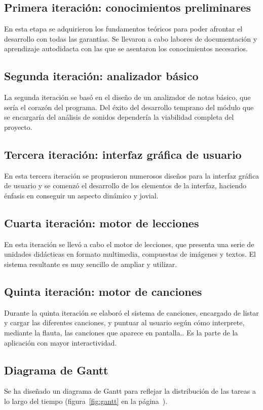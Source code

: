 \documentclass[a4paper,11pt]{article}
\begin{document}
\subsection{Primera iteración: conocimientos preliminares}
En esta etapa se adquirieron los fundamentos teóricos para poder afrontar el
desarrollo con todas las garantías. Se llevaron a cabo labores de documentación
y aprendizaje autodidacta con las que se asentaron los conocimientos necesarios.

\subsection{Segunda iteración: analizador básico}
La segunda iteración se basó en el diseño de un analizador de notas básico, que
sería el corazón del programa. Del éxito del desarrollo temprano del módulo que
se encargaría del análisis de sonidos dependería la viabilidad completa del
proyecto.

\subsection{Tercera iteración: interfaz gráfica de usuario}
En esta tercera iteración se propusieron numerosos diseños para la interfaz
gráfica de usuario y se comenzó el desarrollo de los elementos de la interfaz,
haciendo énfasis en conseguir un aspecto dinámico y jovial.

\subsection{Cuarta iteración: motor de lecciones}
En esta iteración se llevó a cabo el motor de lecciones, que presenta una serie
de unidades didácticas en formato multimedia, compuestas de imágenes y
textos. El sistema resultante es muy sencillo de ampliar y utilizar.

\subsection{Quinta iteración: motor de canciones}
Durante la quinta iteración se elaboró el sistema de canciones, encargado de
listar y cargar las diferentes canciones, y puntuar al usuario según cómo
interprete, mediante la flauta, las canciones que aparece en pantalla.. Es la
parte de la aplicación con mayor interactividad.

\subsection{Diagrama de Gantt}
Se ha diseñado un diagrama de Gantt para reflejar la distribución de las tareas
a lo largo del tiempo (figura~\ref{fig:gantt} en la página~\pageref{fig:gantt}).
\end{document}

